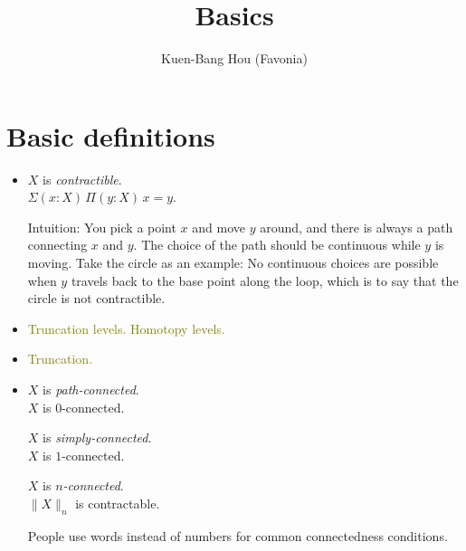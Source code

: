 \documentclass{article}
\title{Basics}
\author{Kuen-Bang Hou (Favonia)}
\begin{document}
\maketitle

\newcommand{\path}{\mathbin{=}}
\newcommand{\TODO}[1]{\textcolor{Olive}{\fbox{\textsc{todo}} {#1}}}

\section{Basic definitions}
\begin{itemize}
  \item
    $X$ is \emph{contractible}.\\
    $\Sigma (x{:}X)\,\Pi (y{:}X)\,x \path y$.
    
    Intuition: You pick a point $x$ and move $y$ around, and there is always
    a path connecting $x$ and $y$. The choice of the path should be continuous
    while $y$ is moving. Take the circle as an example:
    No continuous choices are possible when $y$ travels back to the base point
    along the loop, which is to say that the circle is not contractible.

  \item
    \TODO{Truncation levels. Homotopy levels.}

  \item
    \TODO{Truncation.}

  \item
    $X$ is \emph{path-connected}.
    \\
    $X$ is $0$-connected.
    
    $X$ is \emph{simply-connected}.
    \\
    $X$ is $1$-connected.
    
    $X$ is \emph{$n$-connected}.
    \\
    $\| X \|_n$ is contractable.

    People use words instead of numbers for common connectedness conditions.
\end{itemize}
\end{document}
